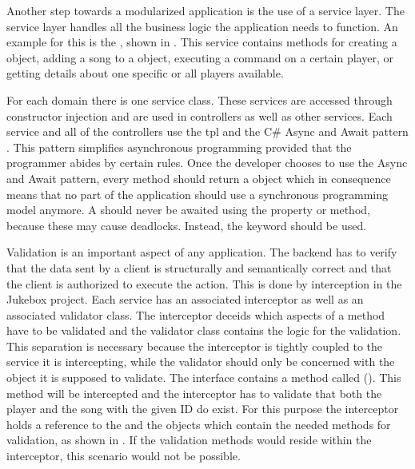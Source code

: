 

Another step towards a modularized application is the use of a service layer. The service layer handles all the business logic the application needs to function. An example for this is the , shown in . This service contains methods for creating a  object, adding a song to a  object, executing a command on a certain player, or getting details about one specific or all players available.

For each domain there is one service class. These services are accessed through constructor injection and are used in controllers as well as other services. Each service and all of the controllers use the \gls{tpl} and the C\# Async and Await pattern \cite{tpl}. This pattern simplifies asynchronous programming provided that the programmer abides by certain rules. Once the developer chooses to use the Async and Await pattern, every method should return a  object which in consequence means that no part of the application should use a synchronous programming model anymore. A  should never be awaited using the  property or  method, because these may cause deadlocks. Instead, the  keyword should be used.


Validation is an important aspect of any application. The backend has to verify that the data sent by a client is structurally and semantically correct and that the client is authorized to execute the action. This is done by interception in the Jukebox project. Each service has an associated interceptor as well as an associated validator class. The interceptor deceids which aspects of a method have to be validated and the validator class contains the logic for the validation. This separation is necessary because the interceptor is tightly coupled to the service it is intercepting, while the validator should only be concerned with the object it is supposed to validate. The  interface contains a method called  (). This method will be intercepted and the interceptor has to validate that both the player and the song with the given ID do exist. For this purpose the interceptor holds a reference to the  and the  objects which contain the needed methods for validation, as shown in . If the validation methods would reside within the interceptor, this scenario would not be possible.

